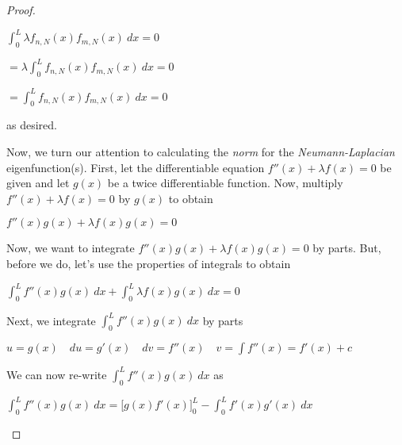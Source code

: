 \documentclass[executivepaper]{article}
\begin{document}
\begin{flushleft}
\begin{proof}
\begin{center}

$\int_{0}^{L} \lambda f_{n,N}(x)f_{m,N}(x) \ dx=0$

\vspace{2mm}

$=\lambda \int_{0}^{L} f_{n,N}(x)f_{m,N}(x) \ dx=0$

\vspace{2mm}

$=\int_{0}^{L} f_{n,N}(x)f_{m,N}(x) \ dx=0$

\end{center}

as desired.

\vspace{5mm}

Now, we turn our attention to calculating the \textit{norm} for the \textit{Neumann-Laplacian} eigenfunction(s). First, let the differentiable equation $f''(x)+\lambda f(x)=0$ be given and let $g(x)$ be a twice differentiable function. Now, multiply $f''(x)+\lambda f(x)=0$ by $g(x)$ to obtain

\begin{center}

$f''(x)g(x)+\lambda f(x)g(x)=0$

\end{center}

Now, we want to integrate $f''(x)g(x)+\lambda f(x)g(x)=0$ by parts. But, before we do, let's use the properties of integrals to obtain

\begin{center}

$\int_{0}^{L} f''(x)g(x) \ dx +\int_{0}^{L} \lambda f(x)g(x) \ dx=0$

\end{center}

Next, we integrate $\int_{0}^{L} f''(x)g(x) \ dx$ by parts

\begin{center}

$u=g(x) \quad du=g'(x) \quad dv=f''(x) \quad v=\int f''(x)=f'(x)+c$

\end{center}

We can now re-write $\int_{0}^{L} f''(x)g(x) \ dx$ as

\begin{center}

$\int_{0}^{L} f''(x)g(x) \ dx=\bigg[g(x)f'(x)\bigg]_{0}^{L} - \int_{0}^{L} f'(x)g'(x) \ dx$

\end{center}


\end{proof}
\end{flushleft}
\end{document}
